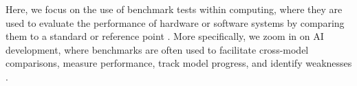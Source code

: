 Here, we focus on the use of benchmark tests within computing, where they are used to evaluate the performance of hardware or software systems by comparing them to a standard or reference point \cite{Henning2000}. More specifically, we zoom in on AI development, where benchmarks are often used to facilitate cross-model comparisons, measure performance, track model progress, and identify weaknesses \cite{reuel_betterbench_2024}.  
